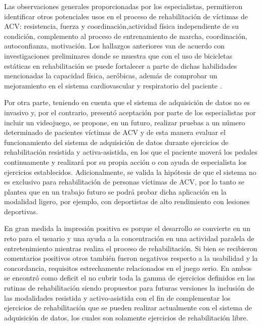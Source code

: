 Las observaciones generales proporcionadas por los especialistas, permitieron identificar otros potenciales usos en el proceso de rehabilitación de víctimas de ACV: resistencia, fuerza y coordinación,actividad física independiente de su condición, complemento al proceso de entrenamiento de marcha, coordinación, autoconfianza, motivación. Los hallazgos anteriores van de acuerdo con investigaciones preliminares donde se muestra que con el uso de bicicletas estáticas en rehabilitación se puede fortalecer a parte de dichas habilidades mencionadas la capacidad física, aeróbicas, además de comprobar un mejoramiento en el sistema cardiovascular y respiratorio del paciente \cite{phadke2019impact, nardone2017passive}.

\vspace{5pt}
Por otra parte, teniendo en cuenta que el sistema de adquisición de datos no es invasivo y, por el contrario, presentó aceptación por parte de los especialistas por incluir un videojuego, se propone, en un futuro, realizar pruebas a un número determinado de pacientes víctimas de ACV y de esta manera evaluar el funcionamiento del sistema de adquisición de datos durante ejercicios de rehabilitación resistida y activa-asistida, en los que el paciente moverá los pedales continuamente y realizará por su propia acción o con ayuda de especialista los ejercicios establecidos. Adicionalmente, se valida la hipótesis de que el sistema no es exclusivo para rehabilitación de personas víctimas de ACV, por lo tanto se plantea que en un trabajo futuro se podrá probar dicha aplicación en la modalidad ligero, por ejemplo, con deportistas de alto rendimiento con lesiones deportivas.

\vspace{5pt}
En gran medida la impresión positiva es porque el desarrollo se convierte en un reto para el usuario y una ayuda a la concentración en una actividad paralela de entretenimiento mientras realiza el proceso de rehabilitación. Si bien se recibieron comentarios  positivos otros también fueron negativos respecto a la usabilidad y la concordancia, requisitos estrechamente relacionados en el juego serio. En ambos se encontró como deficit el no cubrir toda la gamma de ejercicios definidos en las rutinas de rehabilitación siendo propuestos para futuras versiones la inclusión de las modalidades resistida y activo-asistida con el fin de complementar los ejercicios de rehabilitación que se pueden realizar actualmente con el sistema de adquisición de datos, los cuales son solamente ejercicios de rehabilitación libre.
